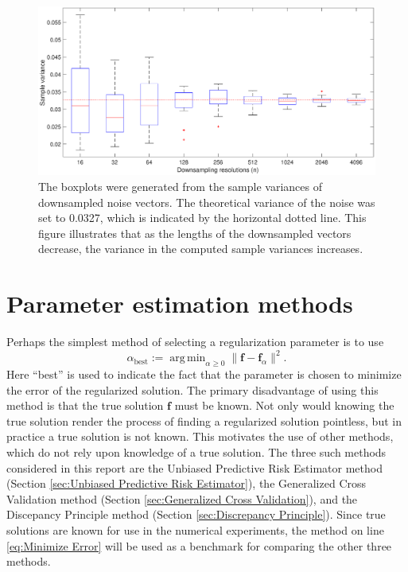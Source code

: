 \documentclass[12pt]{article}
\newcommand{\fdis}{\mathbf{f}}
\newcommand{\regparam}{\alpha}
\newcommand{\freg}{\fdis_{\regparam}}	%
\DeclareMathOperator*{\argmin}{arg\,min}
\begin{document}
\begin{figure}
\centerline{\includegraphics[scale=0.45]{Figures/VarPlot1D_F1_S05_W100_R20.eps}}
\caption{The boxplots were generated from the sample variances of downsampled noise vectors. The theoretical variance of the noise was set to 0.0327, which is indicated by the horizontal dotted line. This figure illustrates that as the lengths of the downsampled vectors decrease, the variance in the computed sample variances increases.}
\label{VarPlot1D}
\end{figure}

\section{Parameter estimation methods} \label{sec:Parameter estimation methods}

Perhaps the simplest method of selecting a regularization parameter is to use
\begin{equation}
\regparam_{\text{best}} := \argmin_{\regparam \geq 0} \|\fdis - \freg\|^2.
\label{eq:Minimize Error}
\end{equation}
Here ``best'' is used to indicate the fact that the parameter is chosen to minimize the error of the regularized solution. The primary disadvantage of using this method is that the true solution $\fdis$ must be known. Not only would knowing the true solution render the process of finding a regularized solution pointless, but in practice a true solution is not known. This motivates the use of other methods, which do not rely upon knowledge of a true solution. The three such methods considered in this report are the Unbiased Predictive Risk Estimator method (Section \ref{sec:Unbiased Predictive Risk Estimator}), the Generalized Cross Validation method (Section \ref{sec:Generalized Cross Validation}), and the Discepancy Principle method (Section \ref{sec:Discrepancy Principle}). Since true solutions are known for use in the numerical experiments, the method on line \eqref{eq:Minimize Error} will be used as a benchmark for comparing the other three methods.
\end{document}
